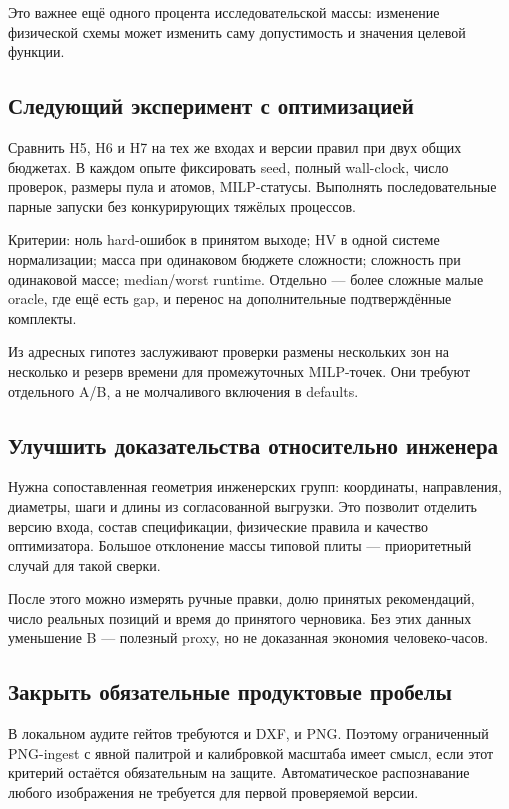 \documentclass[11pt,a4paper]{article}
\begin{document}
Это важнее ещё одного процента исследовательской массы: изменение физической схемы может изменить саму допустимость и значения целевой функции.


\subsection{Следующий эксперимент с оптимизацией}

Сравнить H5, H6 и H7 на тех же входах и версии правил при двух общих бюджетах. В каждом опыте фиксировать seed, полный wall-clock, число проверок, размеры пула и атомов, MILP-статусы. Выполнять последовательные парные запуски без конкурирующих тяжёлых процессов.


Критерии: ноль hard-ошибок в принятом выходе; HV в одной системе нормализации; масса при одинаковом бюджете сложности; сложность при одинаковой массе; median/worst runtime. Отдельно — более сложные малые oracle, где ещё есть gap, и перенос на дополнительные подтверждённые комплекты.


Из адресных гипотез заслуживают проверки размены нескольких зон на несколько и резерв времени для промежуточных MILP-точек. Они требуют отдельного A/B, а не молчаливого включения в defaults.


\subsection{Улучшить доказательства относительно инженера}

Нужна сопоставленная геометрия инженерских групп: координаты, направления, диаметры, шаги и длины из согласованной выгрузки. Это позволит отделить версию входа, состав спецификации, физические правила и качество оптимизатора. Большое отклонение массы типовой плиты — приоритетный случай для такой сверки.


После этого можно измерять ручные правки, долю принятых рекомендаций, число реальных позиций и время до принятого черновика. Без этих данных уменьшение B — полезный proxy, но не доказанная экономия человеко-часов.


\subsection{Закрыть обязательные продуктовые пробелы}

В локальном аудите гейтов требуются и DXF, и PNG. Поэтому ограниченный PNG-ingest с явной палитрой и калибровкой масштаба имеет смысл, если этот критерий остаётся обязательным на защите. Автоматическое распознавание любого изображения не требуется для первой проверяемой версии.
\end{document}
